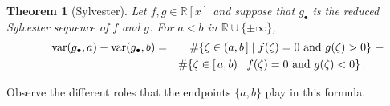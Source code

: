 \documentclass[12pt]{amsart}
\newtheorem{theorem}{Theorem}
\theoremstyle{definition}
\newcommand{\RR}{\mathbb{R}}
\DeclareMathOperator{\var}{{\rm var}}
\begin{document}
\begin{theorem}[Sylvester]
  \label{Th:Sylvester}
  Let $f,g\in\RR[x]$ and suppose that $g_\bullet$ is the reduced Sylvester sequence of $f$ and $g$.
  For $a<b$ in $\RR\cup\{\pm\infty\}$,
  \begin{eqnarray*}
    \qquad\var(g_\bullet,a)-\var(g_\bullet,b)&=&
    \#\{\zeta\in(a,b\hspace{.05cm}]\mid f(\zeta)=0\mbox{ and } g(\zeta)>0\}  \ -\
      \\
    && \#\{\zeta\in[\hspace{.05cm}a,b)\mid f(\zeta)=0\mbox{ and } g(\zeta)<0\}\,.\qquad
  \end{eqnarray*}
\end{theorem}

Observe the different roles that the endpoints $\{a,b\}$ play in this formula.
\end{document}
